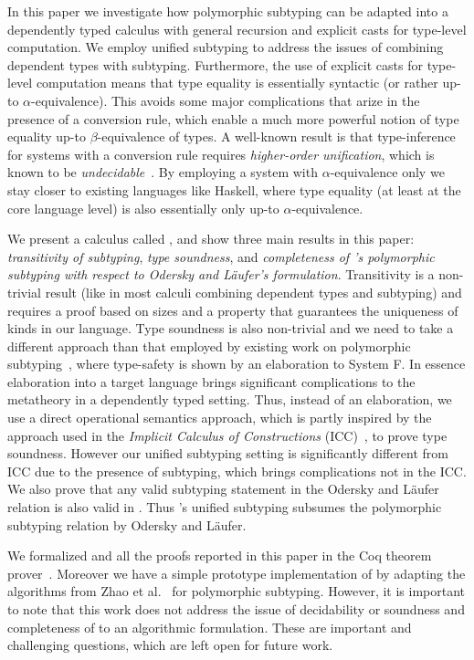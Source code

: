 In this paper we investigate how polymorphic subtyping can be
adapted into a dependently typed calculus with general recursion and
explicit casts for type-level computation. We employ unified subtyping
to address the issues of combining dependent types with subtyping.
Furthermore, the use of explicit casts
for type-level computation means that type equality is essentially
syntactic (or rather up-to $\alpha$-equivalence).
This avoids some major complications that arize in the presence
of a conversion rule, which enable a much more powerful notion of type equality
up-to $\beta$-equivalence of types.
A well-known result is that type-inference for systems
with a conversion rule requires \emph{higher-order
  unification}, which is known to be \emph{undecidable}~\cite{goldfarb1981undecidability}.
By employing a system with $\alpha$-equivalence only we stay closer to existing
languages like Haskell, where type equality (at least at the core language level)
is also essentially only up-to $\alpha$-equivalence.

We present a calculus called \name, and show three main results in this paper:
\emph{transitivity of subtyping}, \emph{type soundness}, and \emph{completeness
of \name's polymorphic subtyping with respect to Odersky and L\"aufer's formulation}.
Transitivity is a non-trivial result (like in most calculi combining dependent types
and subtyping) and requires a proof based on sizes and a property that guarantees
the uniqueness of kinds in our language. Type soundness is also non-trivial and we need
to take a different approach than that employed by existing work on polymorphic
subtyping~\cite{odersky1996putting, jones2007practical}, where type-safety is shown by an
elaboration to System F. In essence elaboration into a target language
brings significant complications to the metatheory in a dependently typed setting.
Thus, instead of an elaboration, we use a direct operational semantics approach, which
is partly inspired by the approach used in the \emph{Implicit Calculus of Constructions} (ICC)~\cite{miquel2001implicit,barras2008implicit},
to prove type soundness. However our unified subtyping setting is significantly
different from ICC due to the presence of subtyping, which brings complications not in the ICC.
We also prove that any valid subtyping statement in the Odersky and L\"aufer relation
is also valid in \name. Thus \name's unified subtyping subsumes the polymorphic subtyping
relation by Odersky and L\"aufer.

We formalized \name and all the proofs reported in this paper in the Coq theorem
prover~\cite{coq}. Moreover we have a simple prototype implementation of \name by adapting
the algorithms from Zhao et al.~\cite{zhao19mechanical} for polymorphic subtyping.
However, it is important to note that this work
does not address the issue of decidability or soundness and completeness of \name to an
algorithmic formulation. These are important and challenging
questions, which are left open for future work.

